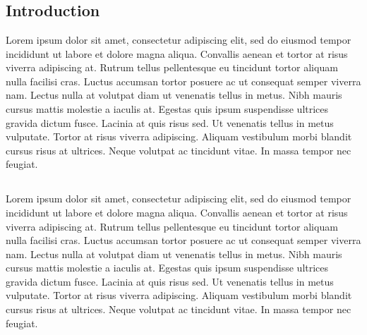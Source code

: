 \chapter{}\label{chap:intro}




%





\section{Introduction}
Lorem ipsum dolor sit amet, consectetur adipiscing elit, sed do eiusmod tempor incididunt ut labore et dolore magna aliqua. Convallis aenean et tortor at risus viverra adipiscing at. Rutrum tellus pellentesque eu tincidunt tortor aliquam nulla facilisi cras. Luctus accumsan tortor posuere ac ut consequat semper viverra nam. Lectus nulla at volutpat diam ut venenatis tellus in metus. Nibh mauris cursus mattis molestie a iaculis at. Egestas quis ipsum suspendisse ultrices gravida dictum fusce. Lacinia at quis risus sed. Ut venenatis tellus in metus vulputate. Tortor at risus viverra adipiscing. Aliquam vestibulum morbi blandit cursus risus at ultrices. Neque volutpat ac tincidunt vitae. In massa tempor nec feugiat.
\section{}
Lorem ipsum dolor sit amet, consectetur adipiscing elit, sed do eiusmod tempor incididunt ut labore et dolore magna aliqua. Convallis aenean et tortor at risus viverra adipiscing at. Rutrum tellus pellentesque eu tincidunt tortor aliquam nulla facilisi cras. Luctus accumsan tortor posuere ac ut consequat semper viverra nam. Lectus nulla at volutpat diam ut venenatis tellus in metus. Nibh mauris cursus mattis molestie a iaculis at. Egestas quis ipsum suspendisse ultrices gravida dictum fusce. Lacinia at quis risus sed. Ut venenatis tellus in metus vulputate. Tortor at risus viverra adipiscing. Aliquam vestibulum morbi blandit cursus risus at ultrices. Neque volutpat ac tincidunt vitae. In massa tempor nec feugiat.






